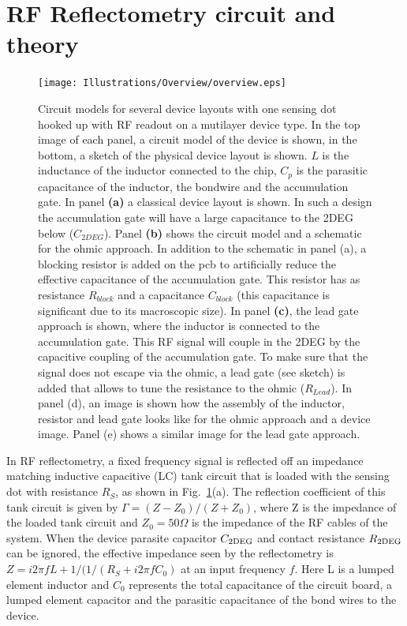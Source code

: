 \documentclass[]{article}
\begin{document}
	

\section{RF Reflectometry circuit and theory} %
\label{sec:rf_reflectometry_circuit_and_theory}


\begin{figure}[h!]
	\texttt{[image: Illustrations/Overview/overview.eps]}
	\caption{Circuit models for several device layouts with one sensing dot hooked up with RF readout on a mutilayer device type.  In the top image of each panel, a circuit model of the device is shown, in the bottom, a sketch of the physical device layout is shown. $L$ is the inductance of the inductor connected to the chip, $C_p$ is the parasitic capacitance of the inductor, the bondwire and the accumulation gate. In panel \textbf{(a)} a classical device layout is shown. In such a design the accumulation gate will have a large capacitance to the 2DEG below ($C_{2DEG}$). Panel \textbf{(b)} shows the circuit model and a schematic for the ohmic approach. In addition to the schematic in panel (a), a blocking resistor is added on the pcb to artificially reduce the effective capacitance of the accumulation gate. This resistor has as resistance $R_{block}$ and a capacitance $C_{block}$ (this capacitance is significant due to its macroscopic size). In panel \textbf{(c)}, the lead gate approach is shown, where the inductor is connected to the accumulation gate. This RF signal will couple in the 2DEG by the capacitive coupling of the accumulation gate. To make sure that the signal does not escape via the ohmic, a lead gate (see sketch) is added that allows to tune the resistance to the ohmic ($R_{Lead}$). In panel (d), an image is shown how the assembly of the inductor, resistor and lead gate looks like for the ohmic approach and a device image. Panel (e) shows a similar image for the lead gate approach.}
	\label{fig:overview}
\end{figure}

\label{sub:why_sige_is_very_different_from_the_simples_reflectometry}
In RF reflectometry, a fixed frequency signal is reflected off an impedance matching inductive capacitive (LC) tank circuit that is loaded with the sensing dot with resistance $R_S$, as shown in Fig.\ \ref{fig:overview}(a). The reflection coefficient of this tank circuit is given by $\Gamma=(Z-Z_0)/(Z+Z_0)$, where Z is the impedance of the loaded tank circuit and $Z_0 = 50 \Omega$ is the impedance of the RF cables of the system. When the device parasite capacitor $C_{\rm 2DEG}$ and contact resistance $R_{\rm 2DEG}$ can be ignored, the effective impedance seen by the reflectometry is $Z = i2\pi fL + 1/(1/(R_S + i2\pi fC_0)$ at an input frequency $f$. Here L is a lumped element inductor and $C_0$ represents the total capacitance of the circuit board, a lumped element capacitor and the parasitic capacitance of the bond wires to the device. 
\end{document}

